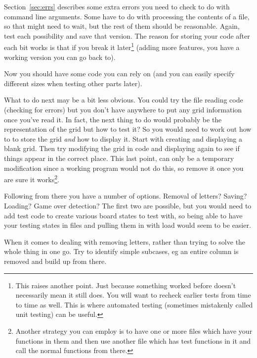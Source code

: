 Section~\ref{sec:errs} describes some extra errors you need to check to do with command line arguments.
Some have to do with processing the contents of a file, so that might need to wait, but the rest of them
should be reasonable.
Again, test each possibility and save that version.
The reason for storing your code after each bit works is that if you break it later\footnote{This raises
another point. Just because something worked before doesn't necessarily mean it still does.
You will want to recheck earlier tests from time to time as well. This is where
automated testing (sometimes mistakenly called unit testing) can be useful.} (adding more features, you have a 
working version you can go back to).

Now you should have some code you can rely on (and you can easily specify different sizes when testing other parts later).

What to do next may be a bit less obvious.
You could try the file reading code (checking for errors) but you don't have anywhere to put any grid information once you've
read it.
In fact, the next thing to do would probably be the representation of the grid but how to test it?
So you would need to work out how to to store the grid \emph{and} how to display it.
Start with creating and displaying a blank grid.
Then try modifying the grid in code and displaying again to see if things appear in the correct place.
This last point, can only be a temporary modification since a working program would not do this, so remove it once you 
are sure it works\footnote{Another strategy you can employ is to have one or more files which have your functions in them and then
use another file which has test functions in it and call the normal functions from there.}.

Following from there you have a number of options.
Removal of letters? Saving? Loading? Game over detection?
The first two are possible, but you would need to add test code to create various board states to test with, so being able 
to have your testing states in files and pulling them in with load would seem to be easier.

When it comes to dealing with removing letters, rather than trying to solve the whole thing in one go.
Try to identify simple subcases, eg an entire column is removed and build up from there.

